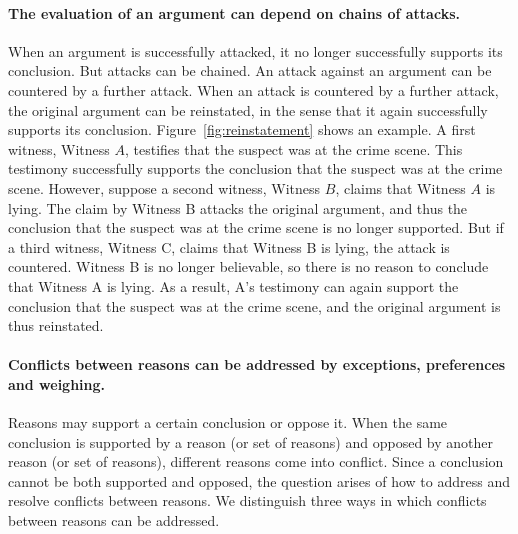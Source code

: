 \documentclass[10pt]{article}
\begin{document}
\paragraph{The evaluation of an argument can depend on chains of attacks.} When an argument is successfully attacked, it no longer successfully supports its conclusion. But attacks can be chained. An attack against an argument can be countered by a further attack. When an attack is countered by a further attack, 
the original argument can be reinstated, in the sense that it again successfully supports its conclusion. Figure~\ref{fig:reinstatement} shows an example. A first witness, Witness $A$, testifies that the suspect was at the crime scene. This testimony successfully 
supports the conclusion that the suspect was at the crime scene. However, suppose a second witness, Witness $B$, claims that Witness $A$ is lying. 
The claim by Witness B attacks the original argument, and thus 
the conclusion that the suspect was at the crime scene is no longer supported. But if a third witness, Witness C, claims that Witness B is lying, 
the attack is countered. Witness B is no longer believable, so there is no reason to conclude that Witness A is lying. As a result, A's testimony can 
again support the conclusion that the suspect was at the crime scene, and the original argument is thus reinstated. 

\paragraph{Conflicts between reasons can be addressed by exceptions, preferences and weighing.} 
Reasons may support a certain conclusion or oppose it.
When the same conclusion is supported by a reason (or set of reasons) 
and opposed by another reason (or set of reasons),
different reasons come into conflict. Since a conclusion cannot 
be both supported and opposed, the question arises of how to address and resolve conflicts between reasons. 
We distinguish three ways in which conflicts between reasons can be addressed. 
\end{document}
